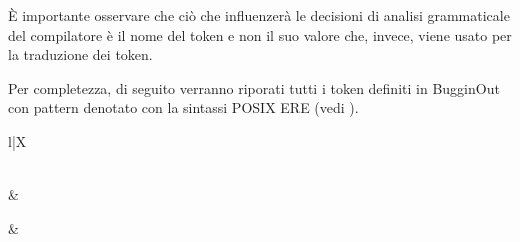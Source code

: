 \`E importante osservare che ci\`o che influenzer\`a le decisioni di analisi grammaticale del compilatore \`e il nome del token e non il suo valore che, invece, viene usato per la traduzione dei token.

Per completezza, di seguito verranno riporati tutti i token definiti in BugginOut con pattern denotato con la sintassi POSIX ERE (vedi \cite{iso-9945-2009}).

\begin{xltabular}{\textwidth}{l|X}
	\caption{Token di BugginOut}
	\label{fig:bugginout-complete-tokens} \\

	\hline
	\hline
	 &  \\
	\hline
	\endfirsthead

	\hline
	 &  \\
	\hline
	\endhead

	\hline
	\endfoot

	\hline
	\hline
	\endlastfoot


\end{xltabular}
